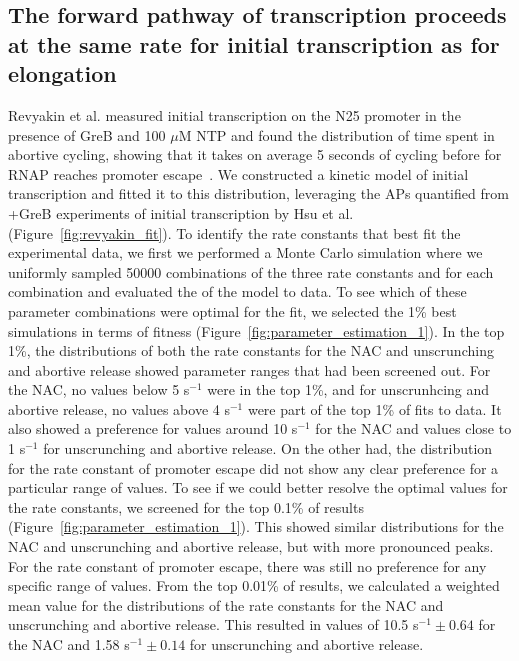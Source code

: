%
\subsection{The forward pathway of transcription proceeds at the same rate
for initial transcription as for elongation}
Revyakin et al. measured initial transcription on the N25 promoter in the
presence of GreB and 100 $\mu$M NTP and found the distribution of time spent
in abortive cycling, showing that it takes on average 5 seconds of cycling
before for RNAP reaches promoter escape~\cite{revyakin_abortive_2006}. We
constructed a kinetic model of initial transcription and fitted it to this
distribution, leveraging the APs quantified from +GreB experiments of initial
transcription by Hsu et al. ~\cite{hsu_initial_2006}
(Figure~\ref{fig:revyakin_fit}). To identify the rate constants that best fit
the experimental data, we first we performed a Monte Carlo simulation where we
uniformly sampled 50000 combinations of the
three rate constants and for each combination and evaluated the of the model
to data. To see which of these parameter combinations were optimal for the
fit, we selected the 1\% best simulations in terms of fitness
(Figure~\ref{fig:parameter_estimation_1}). In the top 1\%, the distributions
of both the rate constants for the NAC and unscrunching and abortive release
showed parameter ranges that had been screened out. For the NAC, no
values below 5 s$^{-1}$ were in the top 1\%, and for unscrunhcing and abortive
release, no values above 4 s$^{-1}$ were part of the top 1\% of fits to data.
It also showed a preference for values around 10 s$^{-1}$ for the NAC and
values close to 1 s$^{-1}$ for unscrunching and abortive release. On the
other had, the distribution for the rate constant of promoter escape did not
show any clear preference for a particular range of values. To see if we could
better resolve the optimal values for the rate constants, we screened for the
top 0.1\% of results (Figure~\ref{fig:parameter_estimation_1}). This showed
similar distributions for the NAC and unscrunching and abortive release, but
with more pronounced peaks. For the rate constant of promoter escape, there
was still no preference for any specific range of values. From the top 0.01\%
of results, we calculated a weighted mean value for the distributions of the
rate constants for the NAC and unscrunching and abortive release. This
resulted in values of 10.5 s$^{-1} \pm 0.64$ for the NAC and 1.58
s$^{-1} \pm 0.14$ for unscrunching and abortive release.

